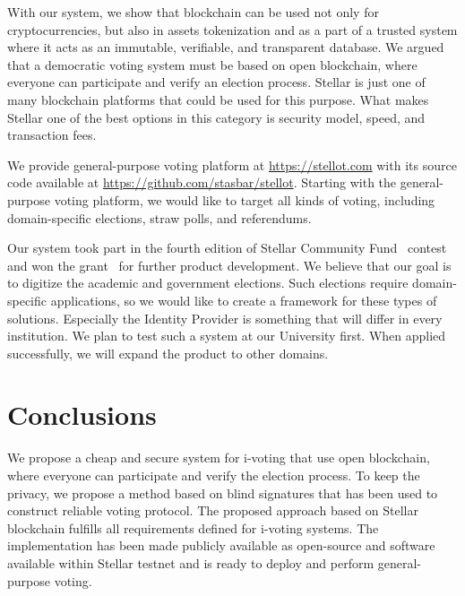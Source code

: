 \documentclass[applsci,article,submit,moreauthors,pdftex]{Definitions/mdpi}
\begin{document}
With our system, we show that blockchain can be used not only for cryptocurrencies, but also in assets tokenization and as a part of a trusted system where it acts as an immutable, verifiable, and transparent database. We argued that a democratic voting system must be based on open blockchain, where everyone can participate and verify an election process. Stellar is just one of many blockchain platforms that could be used for this purpose. What makes Stellar one of the best options in this category is security model, speed, and transaction fees. 

We provide general-purpose voting platform at \url{https://stellot.com} with its source code available at \url{https://github.com/stasbar/stellot}.
Starting with the general-purpose voting platform, we would like to target all kinds of voting, including domain-specific elections, straw polls, and referendums.

Our system took part in the fourth edition of Stellar Community Fund~\cite{StellarC85:online} contest and won the grant~\cite{StellarC62:online} for further product development. We believe that our goal is to digitize the academic and government elections. Such elections require domain-specific applications, so we would like to create a framework for these types of solutions. Especially the Identity Provider is something that will differ in every institution. We plan to test such a system at our University first. When applied successfully, we will expand the product to other domains.

\section{Conclusions}
We propose a cheap and secure system for i-voting that use 
open blockchain, where everyone can participate and verify the election process.
To keep the privacy, we propose a method based on blind signatures 
that has been used to construct reliable voting protocol.
The proposed approach based on Stellar blockchain fulfills all requirements defined for i-voting systems.
The implementation has been made publicly available as open-source and software available within Stellar testnet and is ready to deploy and perform general-purpose voting.

\end{document}
